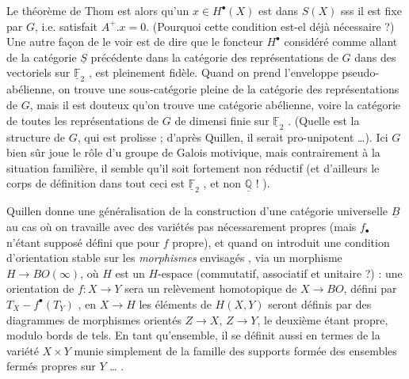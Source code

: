 \documentclass[11pt,a4paper]{article}
\begin{document}
Le théorème de Thom est alors qu'un $x \in H^{\bullet}(X)$ est dans $S(X)$ sss
il est fixe par $G$, i.e. satisfait $A^{+} . x = 0$. (Pourquoi cette condition
est-el déjà nécessaire ?) Une autre façon de le voir est de dire que le
foncteur $H^{\bullet}$ considéré comme allant de la catégorie
$\underline{S}$ précédente dans la catégorie des représentations de $G$ dans
des vectoriels sur $\underline{\mathbb{F}}_{2}$ , est pleinement fidèle. Quand
on prend l'enveloppe pseudo-abélienne, on trouve une sous-catégorie pleine de
la catégorie des représentations de $G$, mais il est douteux qu'on trouve une
catégorie abélienne, voire la catégorie de toutes les représentations de $G$
de dimensi finie sur $\underline{\mathbb{F}}_{2}$ . (Quelle est la
structure de $G$, qui est prolisse ; d'après Quillen, il serait
pro-unipotent …). Ici $G$ bien sûr joue le rôle d'u groupe de
Galois motivique, mais contrairement à la situation familière, il semble qu'il
soit fortement non réductif (et d'ailleurs le corps de définition dans tout
ceci est $\underline{\mathbb{F}}_{2}$ , et non $\underline{\mathbb{Q}}$ ! ).

Quillen donne une généralisation de la construction d'une catégorie
universelle $\underline{B}$ au cas où on travaille avec des variétés pas
nécessarement propres (mais $f_{\bullet}$ n'étant supposé défini que
pour $f$ propre), et quand on introduit une condition d'orientation
stable sur les \emph{morphismes} envisagés , via un morphisme
$H \to BO(\infty)$, où $H$ est un $H$-espace (commutatif, associatif et
unitaire ?) : une orientation de $f : X \to Y$ sera un relèvement homotopique
de $X \to BO$, défini par $T_{X} - f^{\bullet}(T_{Y})$ , en $X \to H$ les
éléments de $H(X, Y)$ seront définis par des diagrammes de morphismes orientés
$Z \to X$, $Z \to Y$, le deuxième étant propre, modulo bords de tels. En tant
qu'ensemble, il se définit aussi en termes de la variété $X \times Y$ munie
simplement de la famille des supports formée des ensembles fermés propres sur
$Y$ … .


\end{document}

